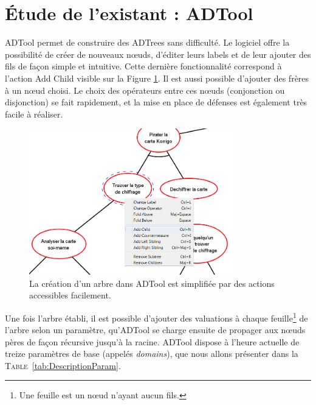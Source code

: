 \section{\'Etude de l'existant : ADTool}
	\label{sec:adtool}

	ADTool permet de construire des ADTrees sans difficulté. Le logiciel offre la possibilité de créer de nouveaux nœuds, d'éditer leurs labels et de leur ajouter des fils de façon simple et intuitive. Cette dernière fonctionnalité correspond à l'action \og Add Child \fg{} visible sur la {\sc Figure} \ref{fig:arbre_exemple_1}. Il est aussi possible d'ajouter des frères à un nœud choisi. Le choix des opérateurs entre ces nœuds (conjonction ou disjonction)  se fait rapidement, et la mise en place de défenses est également très facile à réaliser. 
	
	\begin{figure}[h]
        \centering
        \includegraphics[width=0.8\textwidth]{figure/adtool_add_child.png}
        \caption{La création d'un arbre dans ADTool est simplifiée par des actions accessibles facilement.}
        \label{fig:arbre_exemple_1}
    \end{figure}
	
	Une fois l'arbre établi, il est possible d'ajouter des valuations à chaque feuille\footnote{Une feuille est un nœud n'ayant aucun fils.} de l'arbre selon un paramètre, qu'ADTool se charge ensuite de propager aux nœuds pères de façon récursive jusqu'à la racine. ADTool dispose à l'heure actuelle de treize paramètres de base (appelés \textit{domains}), que nous allons présenter dans la \textsc{Table}~\ref{tab:DescriptionParam}.
					
